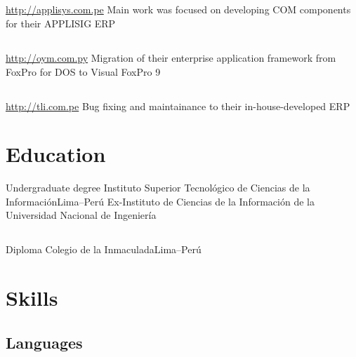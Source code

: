\documentclass[11pt,a4paper,english]{moderncv}
\begin{document}
\subsection{}

{
\url{http://applisys.com.pe}
\newline{}
Main work was focused on developing COM components for their APPLISIG ERP
}

\subsection{}

{
\url{http://oym.com.py}
\newline{}
Migration of their enterprise application framework from FoxPro for DOS to Visual FoxPro 9
}

\subsection{}

{
\url{http://tli.com.pe}
\newline{}
Bug fixing and maintainance to their in-house-developed ERP
}

\clearpage

\section{Education}
    {Undergraduate degree}
    {Instituto Superior Tecnológico de Ciencias de la Información}{Lima--Perú}
    {}{Ex-Instituto de Ciencias de la Información de la Universidad Nacional de Ingeniería}

\subsection{}

    {Diploma}
    {Colegio de la Inmaculada}{Lima--Perú}
    {}{}
    
\section{Skills}

\subsection{Languages}
\end{document}
